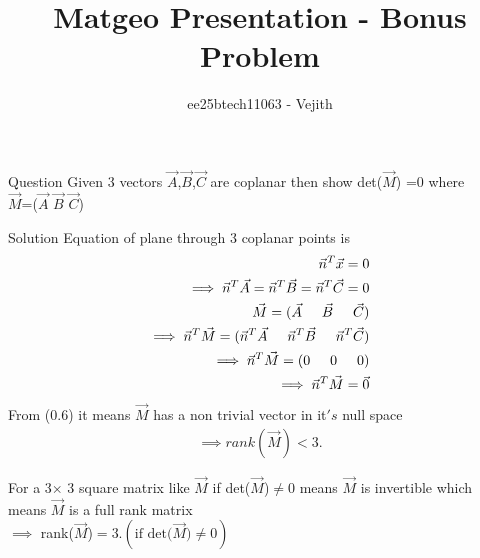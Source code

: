 \documentclass{beamer}
\title{Matgeo Presentation - Bonus Problem}
\author{ee25btech11063 - Vejith}
\numberwithin{equation}{section}
\providecommand{\brak}[1]{\ensuremath{\left(#1\right)}}
\theoremstyle{remark}
\begin{document}
\frame{\titlepage}
\begin{frame}{Question}
Given 3 vectors $\Vec{A}$,$\Vec{B}$,$\Vec{C}$ are coplanar then show det($\Vec{M}$) =0 where\\ $\Vec{M}$=($\Vec{A}$  $\Vec{B}$  $\Vec{C}$)
\end{frame}

\begin{frame}{Solution}
   Equation of plane through 3 coplanar points is 
\begin{align}
    \Vec{n}^T\Vec{x}=0\\
    \implies \Vec{n}^T\Vec{A}= \Vec{n}^T\Vec{B} = \Vec{n}^T\Vec{C}=0\\
    \Vec{M}=(\Vec{A} \hspace{0.5cm} \Vec{B} \hspace{0.5cm} \Vec{C})\\
    \implies \Vec{n}^T\Vec{M}=(\Vec{n}^T\Vec{A} \hspace{0.5cm}  \Vec{n}^T\Vec{B} \hspace{0.5cm} \Vec{n}^T\Vec{C})\\
    \implies \Vec{n}^T\Vec{M}=(0\hspace{0.5cm} 0 \hspace{0.5cm} 0)\\
    \implies \Vec{n}^T\Vec{M}=\Vec{0}
    \end{align}
From (0.6) it means $\Vec{M}$ has a non trivial vector in it$'s$ null space
\begin{align}
    \implies rank(\Vec{M})<3.
\end{align}

For a 3$\times$ 3  square matrix like $\Vec{M}$ if det($\Vec{M}$)$\neq$0 means $\Vec{M}$ is invertible which means $\Vec{M}$ is a full rank matrix\\ 
$\implies$ rank($\Vec{M}$)$=$3.\brak{\text{if det($\Vec{M}$)$\neq$0}}
\end{frame}
\end{document}
